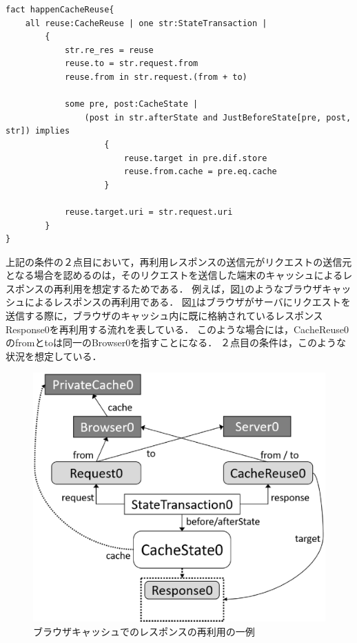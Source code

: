 \documentclass[12pt,a4paper]{jbook}
\begin{document}
\begin{lstlisting}[caption=CacheReuseの発生条件, label=code:happenCacheReuse]
fact happenCacheReuse{
	all reuse:CacheReuse | one str:StateTransaction |
		{
			str.re_res = reuse
			reuse.to = str.request.from
			reuse.from in str.request.(from + to)

			some pre, post:CacheState |
				(post in str.afterState and JustBeforeState[pre, post, str]) implies
					{
						reuse.target in pre.dif.store
						reuse.from.cache = pre.eq.cache
					}

			reuse.target.uri = str.request.uri
		}
}
\end{lstlisting}

上記の条件の２点目において，再利用レスポンスの送信元がリクエストの送信元となる場合を認めるのは，そのリクエストを送信した端末のキャッシュによるレスポンスの再利用を想定するためである．
例えば，図\ref{fig:BrowserCacheReuse}のようなブラウザキャッシュによるレスポンスの再利用である．
図\ref{fig:BrowserCacheReuse}はブラウザがサーバにリクエストを送信する際に，ブラウザのキャッシュ内に既に格納されているレスポンスResponse0を再利用する流れを表している．
このような場合には，CacheReuse0のfromとtoは同一のBrowser0を指すことになる．
２点目の条件は，このような状況を想定している．

\begin{figure}[htb]
\centering
\includegraphics[width=350pt]{./fig/BrowserCacheReuse.eps}
\caption{ブラウザキャッシュでのレスポンスの再利用の一例}
\label{fig:BrowserCacheReuse}
\end{figure}
\end{document}
